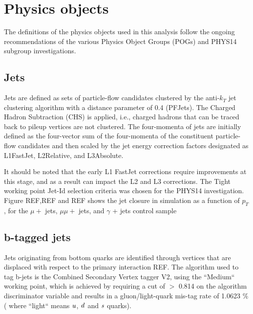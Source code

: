 \section{Physics objects}
\label{sec:objects}
The definitions of the physics objects used in this analysis follow the ongoing recommendations of the various Physics Object Groups (POGs) and PHYS14 subgroup investigations. 

\subsection{Jets}

Jets are defined as sets of particle-flow candidates clustered by the
anti-$k_{T}$ jet clustering algorithm with a distance parameter of 0.4
(PFJets). The Charged Hadron Subtraction (CHS) is applied, i.e., charged
hadrons that can be traced back to pileup vertices are not clustered.
The four-momenta of jets are initially defined as the four-vector sum of
the four-momenta of the constituent particle-flow candidates and then
scaled by the jet energy correction factors designated as L1FastJet,
L2Relative, and L3Absolute.

It should be noted that the early L1 FastJet corrections require
improvements at this stage, and as a result can impact the L2 and L3
corrections. The Tight working point Jet-Id selection criteria was
chosen for the PHYS14 investigation. Figure REF,REF and REF shows the
jet closure in simulation as a function of $p_{T}$, for the $\mu +$
jets, $\mu\mu +$ jets, and $\gamma$ + jets control sample

\subsection{b-tagged jets}
Jets originating from bottom quarks are identified through vertices that are displaced with respect to the primary interaction REF. The algorithm used to tag b-jets is the Combined Secondary Vertex tagger V2, using the ``Medium`` working point, which is achieved by requiring a cut of $>$ 0.814 on the algorithm discriminator variable and results in a gluon/light-quark mis-tag rate of 1.0623 $\%$ ( where ``light`` means $\it{u}$, $\it{d}$ and $\it{s}$ quarks).



